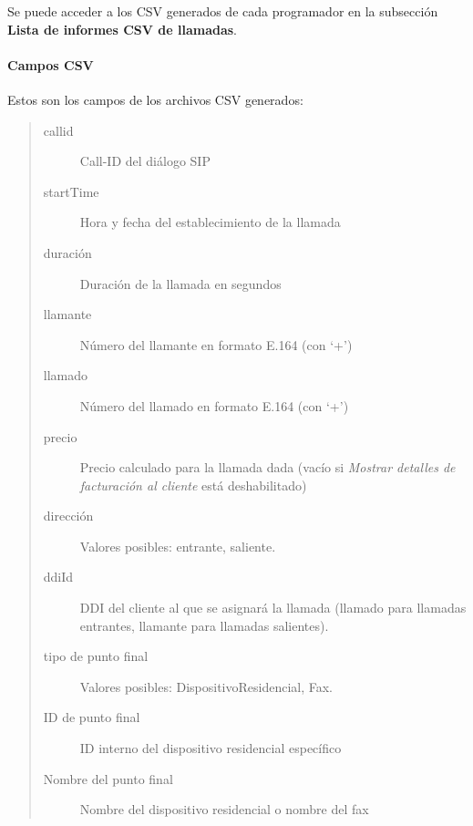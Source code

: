 \documentclass[letterpaper,10pt,spanish]{sphinxmanual}
\begin{document}
Se puede acceder a los CSV generados de cada programador en la subsección \textbf{Lista de informes CSV de llamadas}.


\paragraph{Campos CSV}
\label{administration_portal/client/residential/calls/call_csv_schedulers:csv-fields}
Estos son los campos de los archivos CSV generados:
\begin{quote}
\begin{description}
\item[{callid}] \leavevmode
Call-ID del diálogo SIP

\item[{startTime}] \leavevmode
Hora y fecha del establecimiento de la llamada

\item[{duración}] \leavevmode
Duración de la llamada en segundos

\item[{llamante}] \leavevmode
Número del llamante en formato E.164 (con `+')

\item[{llamado}] \leavevmode
Número del llamado en formato E.164 (con `+')

\item[{precio}] \leavevmode
Precio calculado para la llamada dada (vacío si \emph{Mostrar detalles de facturación al cliente} está deshabilitado)

\item[{dirección}] \leavevmode
Valores posibles: entrante, saliente.

\item[{ddiId}] \leavevmode
DDI del cliente al que se asignará la llamada (llamado para llamadas entrantes, llamante para llamadas salientes).

\item[{tipo de punto final}] \leavevmode
Valores posibles: DispositivoResidencial, Fax.

\item[{ID de punto final}] \leavevmode
ID interno del dispositivo residencial específico

\item[{Nombre del punto final}] \leavevmode
Nombre del dispositivo residencial o nombre del fax

\end{description}
\end{quote}
\end{document}
